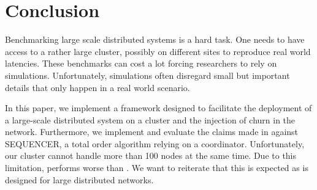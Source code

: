 \section{Conclusion}
\label{sec:conclusion}
Benchmarking large scale distributed systems is a hard task. One needs to have access to a rather large cluster, possibly on different sites to reproduce real world latencies. These benchmarks can cost a lot forcing researchers to rely on simulations. Unfortunately, simulations often disregard small but important details that only happen in a real world scenario.

In this paper, we implement \eptotester a framework designed to facilitate the deployment of a large-scale distributed system on a cluster and the injection of churn in the network. Furthermore, we implement \epto and evaluate the claims made in \autocite{matos2015epto} against \jgroups SEQUENCER, a total order algorithm relying on a coordinator. Unfortunately, our cluster cannot handle more than 100 nodes at the same time. Due to this limitation, \epto performs worse than \jgroups. We want to reiterate that this is expected as \epto is designed for large distributed networks.
